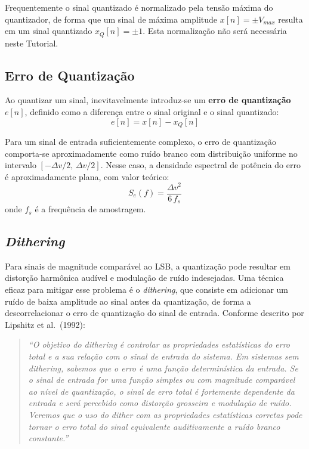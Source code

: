 \documentclass[a4paper,twoside,12pt]{article}
\begin{document}
	Frequentemente o sinal quantizado é normalizado pela tensão máxima do quantizador, de forma que um sinal de máxima amplitude $x[n] = \pm V_{max}$ resulta em um sinal quantizado $x_Q[n] = \pm 1$. Esta normalização não será necessária neste Tutorial.
	
	\subsection{Erro de Quantização}
	
	Ao quantizar um sinal, inevitavelmente introduz-se um \textbf{erro de quantização} $e[n]$, definido como a diferença entre o sinal original e o sinal quantizado:
	\begin{equation}
		e[n] = x[n] - x_Q[n]
		\label{eq:erro}
	\end{equation}
	
	Para um sinal de entrada suficientemente complexo, o erro de quantização comporta-se aproximadamente como ruído branco com distribuição uniforme no intervalo $[-\Delta v/2,\, \Delta v/2]$. Nesse caso, a densidade espectral de potência do erro é aproximadamente plana, com valor teórico:
	\begin{equation}
		S_e(f) = \frac{\Delta v^2}{6\,f_s}
		\label{eq:psd_erro}
	\end{equation}
	onde $f_s$ é a frequência de amostragem.
	
	\subsection{\textit{Dithering}}
	
	Para sinais de magnitude comparável ao LSB, a quantização pode resultar em distorção harmônica audível e modulação de ruído indesejadas. Uma técnica eficaz para mitigar esse problema é o \textit{dithering}, que consiste em adicionar um ruído de baixa amplitude ao sinal antes da quantização, de forma a descorrelacionar o erro de quantização do sinal de entrada. Conforme descrito por Lipshitz et al.\ (1992):
	
	\begin{quote}
		\textit{``O objetivo do dithering é controlar as propriedades estatísticas do erro total e a sua relação com o sinal de entrada do sistema. Em sistemas sem dithering, sabemos que o erro é uma função determinística da entrada. Se o sinal de entrada for uma função simples ou com magnitude comparável ao nível de quantização, o sinal de erro total é fortemente dependente da entrada e será percebido como distorção grosseira e modulação de ruído. Veremos que o uso do dither com as propriedades estatísticas corretas pode tornar o erro total do sinal equivalente auditivamente a ruído branco constante.''}
	\end{quote}
	
\end{document}
